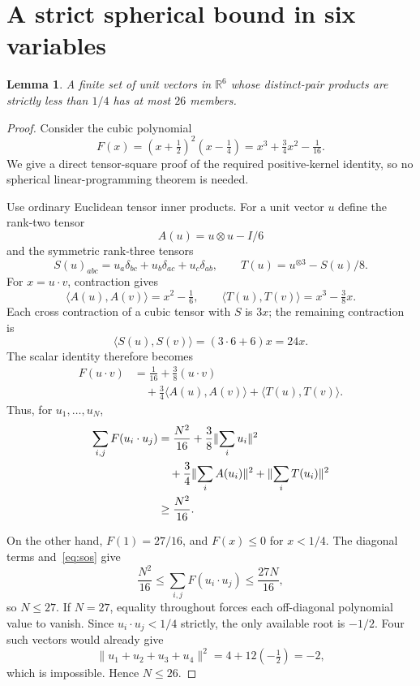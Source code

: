 \documentclass[11pt]{article}
\newtheorem{lemma}[theorem]{Lemma}
\theoremstyle{remark}
\newcommand{\RR}{\mathbb R}
\newcommand{\ip}[2]{\langle #1,#2\rangle}
\newcommand{\norm}[1]{\lVert #1\rVert}
\begin{document}
\section{A strict spherical bound in six variables}\label{sec:code}

\begin{lemma}\label{lem:26}
A finite set of unit vectors in $\RR^6$ whose distinct-pair products
are strictly less than $1/4$ has at most $26$ members.
\end{lemma}
\begin{proof}
Consider the cubic polynomial
\begin{equation}\label{eq:polynomial}
 F(x)=(x+\tfrac12)^2(x-\tfrac14)
     =x^3+\tfrac34x^2-\tfrac1{16}.
\end{equation}
We give a direct tensor-square proof of the required positive-kernel
identity, so no spherical linear-programming theorem is needed.

Use ordinary Euclidean tensor inner products. For a unit vector $u$
define the rank-two tensor
\[
 A(u)=u\otimes u-I/6
\]
and the symmetric rank-three tensors
\[
 S(u)_{abc}=u_a\delta_{bc}+u_b\delta_{ac}+u_c\delta_{ab},
 \qquad T(u)=u^{\otimes3}-S(u)/8.
\]
For $x=u\cdot v$, contraction gives
\begin{equation}\label{eq:kernels}
 \ip{A(u)}{A(v)}=x^2-\tfrac16,
 \qquad \ip{T(u)}{T(v)}=x^3-\tfrac38x.
\end{equation}
Each cross contraction of a cubic tensor with $S$ is $3x$; the
remaining contraction is
\[
 \ip{S(u)}{S(v)}=(3\cdot6+6)x=24x.
\]
The scalar identity therefore becomes
\begin{align*}
 F(u\cdot v)&=\tfrac1{16}+\tfrac38(u\cdot v)\\
 &\quad+\tfrac34\ip{A(u)}{A(v)}+\ip{T(u)}{T(v)}.
\end{align*}
Thus, for $u_1,\ldots,u_N$,
\begin{align}
 \sum_{i,j}F(u_i\cdot u_j)
 &=\frac{N^2}{16}+\frac38\norm{\sum_i u_i}^2\notag\\
 &\quad+\frac34\norm{\sum_i A(u_i)}^2
   +\norm{\sum_i T(u_i)}^2\notag\\
 &\ge\frac{N^2}{16}.\label{eq:sos}
\end{align}

On the other hand, $F(1)=27/16$, and $F(x)\le0$ for $x<1/4$.
The diagonal terms and~\eqref{eq:sos} give
\[
 \frac{N^2}{16}\le\sum_{i,j}F(u_i\cdot u_j)\le\frac{27N}{16},
\]
so $N\le27$. If $N=27$, equality throughout forces each
off-diagonal polynomial value to vanish. Since $u_i\cdot u_j<1/4$
strictly, the only available root is $-1/2$. Four such vectors would
already give
\[
 \norm{u_1+u_2+u_3+u_4}^2=4+12(-\tfrac12)=-2,
\]
which is impossible. Hence $N\le26$.
\end{proof}
\end{document}
